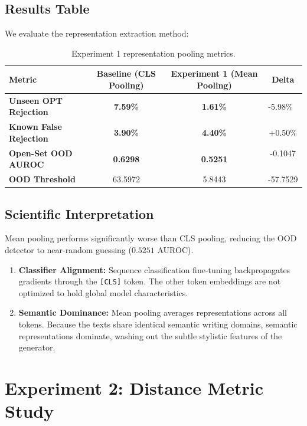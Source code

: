\documentclass[12pt,a4paper]{report}
\begin{document}
\section{Results Table}
We evaluate the representation extraction method:
\begin{table}[h]
\centering
\begin{tabular}{lccc}
\toprule
\textbf{Metric} & \textbf{Baseline (CLS Pooling)} & \textbf{Experiment 1 (Mean Pooling)} & \textbf{Delta} \\
\midrule
\textbf{Unseen OPT Rejection} & \textbf{7.59\%} & \textbf{1.61\%} & -5.98\% 🛑 \\
\textbf{Known False Rejection} & \textbf{3.90\%} & \textbf{4.40\%} & +0.50\% \\
\textbf{Open-Set OOD AUROC} & \textbf{0.6298} & \textbf{0.5251} & -0.1047 🛑 \\
\textbf{OOD Threshold} & 63.5972 & 5.8443 & -57.7529 \\
\bottomrule
\end{tabular}
\caption{Experiment 1 representation pooling metrics.}
\label{tab:exp1_results}
\end{table}

\section{Scientific Interpretation}
Mean pooling performs significantly worse than CLS pooling, reducing the OOD detector to near-random guessing ($0.5251$ AUROC). 
\begin{enumerate}
    \item \textbf{Classifier Alignment:} Sequence classification fine-tuning backpropagates gradients through the \texttt{[CLS]} token. The other token embeddings are not optimized to hold global model characteristics.
    \item \textbf{Semantic Dominance:} Mean pooling averages representations across all tokens. Because the texts share identical semantic writing domains, semantic representations dominate, washing out the subtle stylistic features of the generator.
\end{enumerate}

\chapter{Experiment 2: Distance Metric Study}
\label{ch:exp2}
\end{document}
